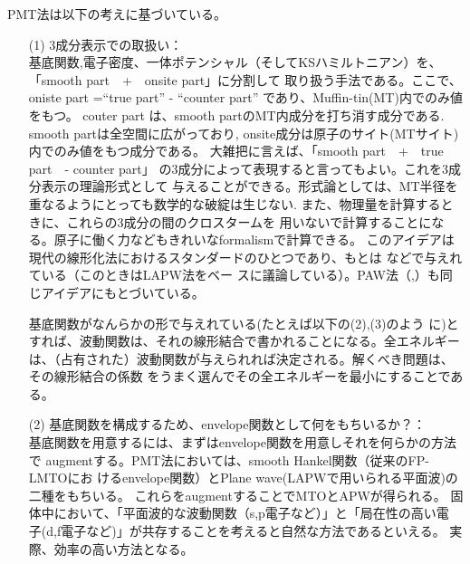 \documentclass[a4paper,10pt,aip,onecolumn,amsmath,amssymb,floatfix,rmp]{revtex4-1}
\begin{document}
PMT法は以下の考えに基づいている。
\begin{itemize}
\item[(1)]
3成分表示での取扱い：\\
基底関数,電子密度、一体ポテンシャル（そしてKSハミルトニアン）を、
「smooth part　+　onsite part」に分割して
取り扱う手法である。ここで、oniste part =``true part'' - ``counter part''
であり、Muffin-tin(MT)内でのみ値をもつ。
couter part は、smooth partのMT内成分を打ち消す成分である.
smooth partは全空間に広がっており,
onsite成分は原子のサイト(MTサイト)内でのみ値をもつ成分である。
大雑把に言えば、「smooth part　+　true part　- counter part」
の3成分によって表現すると言ってもよい。これを3成分表示の理論形式として
与えることができる。形式論としては、MT半径を重なるようにとっても数学的な破綻は生じない.
また、物理量を計算するときに、これらの3成分の間のクロスタームを
用いないで計算することになる。原子に働く力などもきれいなformalismで計算できる。
このアイデアは現代の線形化法におけるスタンダードのひとつであり、もとは
\cite{soler89}などで与えれている（このときはLAPW法をベー
スに議論している）。PAW法（\cite{PAW},\cite{kresse99}）も同じアイデアにもとづいている。

基底関数がなんらかの形で与えれている(たとえば以下の(2),(3)のよう
に)とすれば、波動関数は、それの線形結合で書かれることになる。全エネルギー
は、（占有された）波動関数が与えられれば決定される。解くべき問題は、その線形結合の係数
をうまく選んでその全エネルギーを最小にすることである。



\item[(2)]
基底関数を構成するため、envelope関数として何をもちいるか？：\\
基底関数を用意するには、まずはenvelope関数を用意しそれを何らかの方法で
augmentする。PMT法においては、smooth Hankel関数（従来のFP-LMTOにお
けるenvelope関数）とPlane wave(LAPWで用いられる平面波)の二種をもちいる。
これらをaugmentすることでMTOとAPWが得られる。
固体中において、「平面波的な波動関数（s,p電子など）」と「局在性の高い電
子(d,f電子など)」が共存することを考えると自然な方法であるといえる。
実際、効率の高い方法となる。


\end{itemize}
\end{document}
